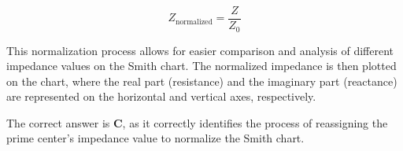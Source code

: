 \[
Z_{\text{normalized}} = \frac{Z}{Z_0}
\]

This normalization process allows for easier comparison and analysis of different impedance values on the Smith chart. The normalized impedance is then plotted on the chart, where the real part (resistance) and the imaginary part (reactance) are represented on the horizontal and vertical axes, respectively.

The correct answer is \textbf{C}, as it correctly identifies the process of reassigning the prime center’s impedance value to normalize the Smith chart.


